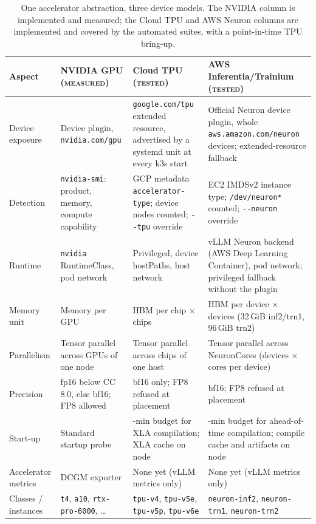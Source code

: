 \documentclass[conference,letterpaper]{IEEEtran}
\newcommand{\code}[1]{\texttt{\small #1}}
\newcommand{\ev}[1]{{\normalfont\textsc{#1}}}
\newcommand{\Measured}{\ev{measured}}
\newcommand{\Tested}{\ev{tested}}
\begin{document}
\begin{table}[t]
\centering
\caption{One accelerator abstraction, three device models. The NVIDIA column is implemented and
measured; the Cloud TPU and AWS Neuron columns are implemented and covered by the automated
suites, with a point-in-time TPU bring-up.}
\label{tab:accel}
\footnotesize
\begin{tabularx}{\textwidth}{@{}>{\raggedright\arraybackslash}p{2.0cm} >{\raggedright\arraybackslash}X >{\raggedright\arraybackslash}X >{\raggedright\arraybackslash}X@{}}
\toprule
Aspect & NVIDIA GPU (\Measured{}) & Cloud TPU (\Tested{}) & AWS Inferentia/Trainium (\Tested{}) \\
\midrule
Device exposure & Device plugin, \code{nvidia.com/gpu} & \code{google.com/tpu} extended resource, advertised by a systemd unit at every k3s start & Official Neuron device plugin, whole \code{aws.amazon.com/neuron} devices; extended-resource fallback \\
Detection & \code{nvidia-smi}: product, memory, compute capability & GCP metadata \code{accelerator-type}; device nodes counted; \code{-{}-tpu} override & EC2 IMDSv2 instance type; \code{/dev/neuron*} counted; \code{-{}-neuron} override \\
Runtime & \code{nvidia} RuntimeClass, pod network & Privileged, device hostPaths, host network & vLLM Neuron backend (AWS Deep Learning Container), pod network; privileged fallback without the plugin \\
Memory unit & Memory per GPU & HBM per chip $\times$ chips & HBM per device $\times$ devices (32\,GiB inf2/trn1, 96\,GiB trn2) \\
Parallelism & Tensor parallel across GPUs of one node & Tensor parallel across chips of one host & Tensor parallel across NeuronCores (devices $\times$ cores per device) \\
Precision & fp16 below CC 8.0, else bf16; FP8 allowed & bf16 only; FP8 refused at placement & bf16; FP8 refused at placement \\
Start-up & Standard startup probe & 40-min budget for XLA compilation; XLA cache on node & 90-min budget for ahead-of-time compilation; compile cache and artifacts on node \\
Accelerator metrics & DCGM exporter & None yet (vLLM metrics only) & None yet (vLLM metrics only) \\
Classes / instances & \code{t4}, \code{a10}, \code{rtx-pro-6000}, \dots & \code{tpu-v4}, \code{tpu-v5e}, \code{tpu-v5p}, \code{tpu-v6e} & \code{neuron-inf2}, \code{neuron-trn1}, \code{neuron-trn2} \\
\bottomrule
\end{tabularx}
\end{table}
\end{document}

